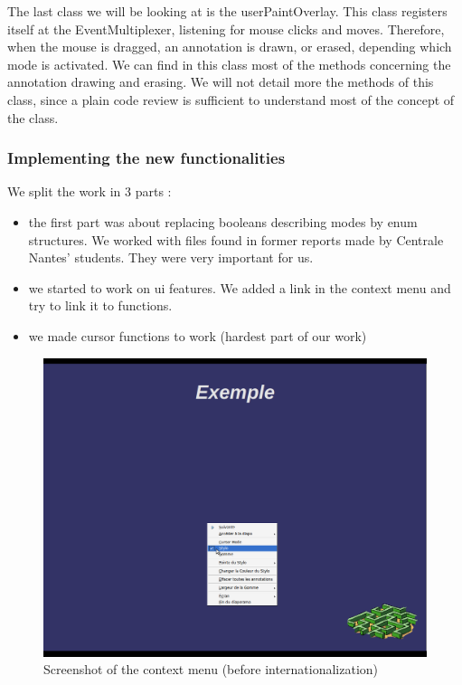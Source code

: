 \documentclass[a4paper,11pt]{article}
\begin{document}
The last class we will be looking at is the userPaintOverlay. This class
registers itself at the EventMultiplexer, listening for mouse clicks and
moves. Therefore, when the mouse is dragged, an annotation is drawn, or
erased, depending which mode is activated. We can find in this class most of
the methods concerning the annotation drawing and erasing. We will not detail
more the methods of this class, since a plain code review is sufficient to
understand most of the concept of the class.


\subsubsection*{Implementing the new functionalities}

We split the work in 3 parts :

\begin{itemize}

\item the first part was about replacing booleans describing modes by enum
structures. We worked with files found in former reports made by Centrale
Nantes' students. They were very important for us.

\item we started to work on ui features. We added a link in the context menu
and try to link it to functions.

\item we made cursor functions to work (hardest part of our work)
\end{itemize}

\begin{figure}[!h]
\centering
\includegraphics[scale=0.3]{images/screenshot_020.png}
\caption{Screenshot of the context menu (before internationalization)}
\end{figure}
\end{document}
